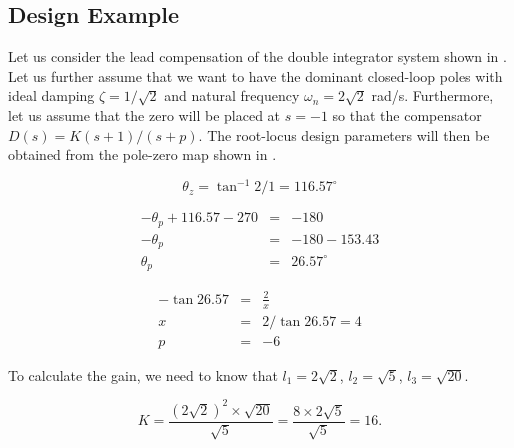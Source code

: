 \subsection*{Design Example}

Let us consider the lead compensation of the double integrator system shown in . Let us further assume that we want to have the dominant closed-loop poles with ideal damping $\zeta=1/\sqrt{2}$ and natural frequency $\omega_n = 2\sqrt{2}$ rad/s. Furthermore, let us assume that the zero will be placed at $s=-1$ so that the compensator $D(s) = K(s+1)/(s+p)$. The root-locus design parameters will then be obtained from the pole-zero map shown in .

$$\theta_z = \tan^{-1} 2/1 = 116.57^\circ$$

\begin{eqnarray*}
	-\theta_p + 116.57 -270 & = & -180 \\
	-\theta_p & = & -180 - 153.43 \\
	\theta_p & = & 26.57^\circ
\end{eqnarray*}

\begin{eqnarray*}
	-\tan 26.57 & = & \frac{2}{x} \\
	x & = & 2/\tan 26.57 = 4 \\
	p & = & -6
\end{eqnarray*}


\begin{slide}\label{slides:ex1-2}
\end{slide}

To calculate the gain, we need to know that $l_1=2\sqrt{2}$, $l_2=\sqrt{5}$, $l_3=\sqrt{20}$.

$$K = \frac{(2\sqrt{2})^2\times \sqrt{20}}{\sqrt{5}} = \frac{8\times 2\sqrt{5}}{\sqrt{5}} = 16.$$

